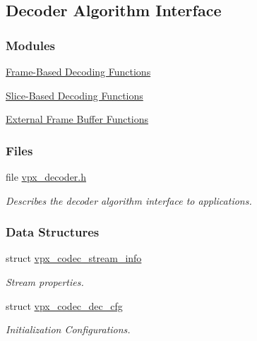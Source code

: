 \hypertarget{group__decoder}{}\subsection{Decoder Algorithm Interface}
\label{group__decoder}
\subsubsection*{Modules}
\begin{DoxyCompactItemize}
\item 
\hyperlink{group__cap__put__frame}{Frame-\/\+Based Decoding Functions}
\item 
\hyperlink{group__cap__put__slice}{Slice-\/\+Based Decoding Functions}
\item 
\hyperlink{group__cap__external__frame__buffer}{External Frame Buffer Functions}
\end{DoxyCompactItemize}
\subsubsection*{Files}
\begin{DoxyCompactItemize}
\item 
file \hyperlink{vpx__decoder_8h}{vpx\+\_\+decoder.\+h}
\begin{DoxyCompactList}\small\item\em Describes the decoder algorithm interface to applications. \end{DoxyCompactList}\end{DoxyCompactItemize}
\subsubsection*{Data Structures}
\begin{DoxyCompactItemize}
\item 
struct \hyperlink{structvpx__codec__stream__info}{vpx\+\_\+codec\+\_\+stream\+\_\+info}
\begin{DoxyCompactList}\small\item\em Stream properties. \end{DoxyCompactList}\item 
struct \hyperlink{structvpx__codec__dec__cfg}{vpx\+\_\+codec\+\_\+dec\+\_\+cfg}
\begin{DoxyCompactList}\small\item\em Initialization Configurations. \end{DoxyCompactList}\end{DoxyCompactItemize}
